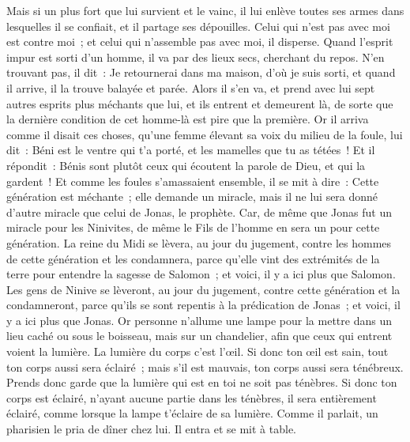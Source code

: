 \begin{multicols}{2}
Mais si un plus fort que lui survient et le vainc, il lui enlève toutes ses armes dans lesquelles il se confiait, et il partage ses dépouilles.
Celui qui n'est pas avec moi est contre moi~; et celui qui n'assemble pas avec moi, il disperse.
Quand l'esprit impur est sorti d'un homme, il va par des lieux secs, cherchant du repos. N'en trouvant pas, il dit~: Je retournerai dans ma maison, d'où je suis sorti,
et quand il arrive, il la trouve balayée et parée.
Alors il s'en va, et prend avec lui sept autres esprits plus méchants que lui, et ils entrent et demeurent là, de sorte que la dernière condition de cet homme-là est pire que la première.
Or il arriva comme il disait ces choses, qu'une femme élevant sa voix du milieu de la foule, lui dit~: Béni est le ventre qui t'a porté, et les mamelles que tu as tétées~!
Et il répondit~: Bénis sont plutôt ceux qui écoutent la parole de Dieu, et qui la gardent~!
Et comme les foules s'amassaient ensemble, il se mit à dire~: Cette génération est méchante~; elle demande un miracle, mais il ne lui sera donné d'autre miracle que celui de Jonas, le prophète.
Car, de même que Jonas fut un miracle pour les Ninivites, de même le Fils de l'homme en sera un pour cette génération.
La reine du Midi se lèvera, au jour du jugement, contre les hommes de cette génération et les condamnera, parce qu'elle vint des extrémités de la terre pour entendre la sagesse de Salomon~; et voici, il y a ici plus que Salomon.
Les gens de Ninive se lèveront, au jour du jugement, contre cette génération et la condamneront, parce qu'ils se sont repentis à la prédication de Jonas~; et voici, il y a ici plus que Jonas.
Or personne n'allume une lampe pour la mettre dans un lieu caché ou sous le boisseau, mais sur un chandelier, afin que ceux qui entrent voient la lumière.
La lumière du corps c'est l'œil. Si donc ton œil est sain, tout ton corps aussi sera éclairé~; mais s'il est mauvais, ton corps aussi sera ténébreux.
Prends donc garde que la lumière qui est en toi ne soit pas ténèbres.
Si donc ton corps est éclairé, n'ayant aucune partie dans les ténèbres, il sera entièrement éclairé, comme lorsque la lampe t'éclaire de sa lumière.
Comme il parlait, un pharisien le pria de dîner chez lui. Il entra et se mit à table.

\end{multicols}
